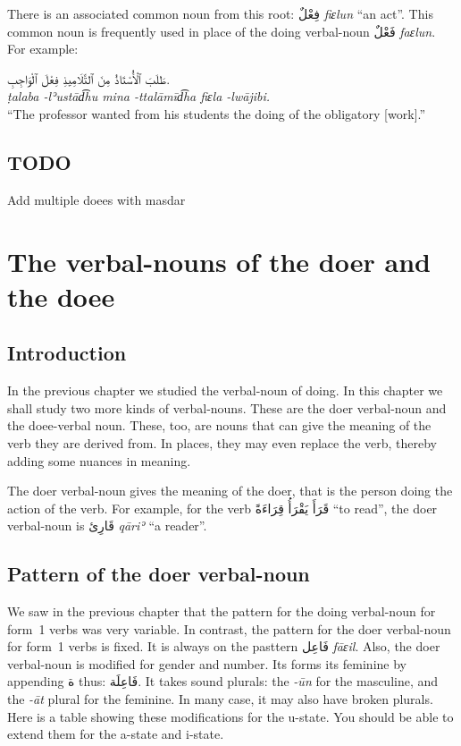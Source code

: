 \documentclass[
  10pt,
]{book}
\begin{document}
There is an associated common noun from this root: \foreignlanguage{arabic}{فِعْلٌ} \emph{fiɛlun} \enquote{an act}. This common noun is frequently used in place of the doing verbal-noun \foreignlanguage{arabic}{فَعْلٌ} \emph{faɛlun}. For example:

\foreignlanguage{arabic}{طَلَبَ ٱلْأُسْتَاذُ مِنَ ٱلتَّلَامِيذِ فِعْلَ ٱلْوَاجِبِ.}\\
\emph{ṭalaba -lʾustād͡hu mina -ttalāmīd͡ha fiɛla -lwājibi.}\\
\enquote{The professor wanted from his students the doing of the obligatory {[}work{]}.}

\section{TODO}\label{todo-1}

Add multiple doees with masdar

\chapter{The verbal-nouns of the doer and the doee}\label{the-verbal-nouns-of-the-doer-and-the-doee}

\section{Introduction}\label{introduction-17}

In the previous chapter we studied the verbal-noun of doing. In this chapter we shall study two more kinds of verbal-nouns. These are the doer verbal-noun and the doee-verbal noun. These, too, are nouns that can give the meaning of the verb they are derived from. In places, they may even replace the verb, thereby adding some nuances in meaning.

The doer verbal-noun gives the meaning of the doer, that is the person doing the action of the verb. For example, for the verb \foreignlanguage{arabic}{قَرَأَ يَقْرَأُ قِرَاءَةً} \enquote{to read}, the doer verbal-noun is \foreignlanguage{arabic}{قَارِئ} \emph{qāriʾ} \enquote{a reader}.

\section{Pattern of the doer verbal-noun}\label{pattern-of-the-doer-verbal-noun}

We saw in the previous chapter that the pattern for the doing verbal-noun for form~1 verbs was very variable. In contrast, the pattern for the doer verbal-noun for form~1 verbs is fixed. It is always on the pasttern \foreignlanguage{arabic}{فَاعِل} \emph{fāɛil}. Also, the doer verbal-noun is modified for gender and number. Its forms its feminine by appending \foreignlanguage{arabic}{ة} thus: \foreignlanguage{arabic}{فَاعِلَة}. It takes sound plurals: the \emph{-ūn} for the masculine, and the \emph{-āt} plural for the feminine. In many case, it may also have broken plurals. Here is a table showing these modifications for the u-state. You should be able to extend them for the a-state and i-state.
\end{document}
